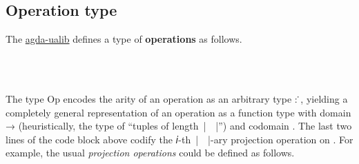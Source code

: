 \documentclass[sigplan,screen]{acmart}
\newcommand\ab[1]{\AgdaBound{#1}}
\newcommand{\agdaualib}{\href{https://ualib.org}{agda-ualib}\xspace}
\newcommand{\agdaualib}{\href{anonymizedLink/agda-ualib.html}{agda-ualib}\xspace}
\begin{document}
\subsection{Operation type}
The \agdaualib defines a type of \textbf{operations} as follows.

\begin{code}%
\>[0]\<%
\\
\>[0]\AgdaSpace{}%
\AgdaSymbol{:}\AgdaSpace{}%
\AgdaSpace{}%
\AgdaSpace{}%
\AgdaSpace{}%
\AgdaSpace{}%
\AgdaSpace{}%
\AgdaSpace{}%
\AgdaSpace{}%
\AgdaSpace{}%
\AgdaSpace{}%
\<%
\\
\>[0]\AgdaSpace{}%
\AgdaSpace{}%
\AgdaSpace{}%
\AgdaSymbol{=}\AgdaSpace{}%
\AgdaSymbol{(}\AgdaSpace{}%
\AgdaSpace{}%
\AgdaSymbol{)}\AgdaSpace{}%
\AgdaSpace{}%
\<%
\end{code}
The type Op encodes the arity of an operation as an arbitrary type \ab 𝐼 : \ab 𝓥 ̇, yielding a completely general representation of an operation as a function type with domain \ab 𝐼 → \ab 𝐴 (heuristically, the type of ``tuples of length~|~\ab 𝐼~|'') and codomain \ab 𝐴. The last two lines of the code block above codify the 𝑖-th~|~\ab 𝐼~|-ary projection operation on \ab 𝐴. For example, the usual \emph{projection operations} could be defined as follows.
\begin{code}%
\\[\AgdaEmptyExtraSkip]%
\>[0]\<%
\\
\>[0]\AgdaSpace{}%
\AgdaSymbol{:}\AgdaSpace{}%
\AgdaSymbol{\{}\AgdaSpace{}%
\AgdaSymbol{:}\AgdaSpace{}%
\AgdaSpace{}%
\AgdaSpace{}%
\AgdaSymbol{\}}\AgdaSpace{}%
\AgdaSymbol{\{}\AgdaSpace{}%
\AgdaSymbol{:}\AgdaSpace{}%
\AgdaSpace{}%
\AgdaSpace{}%
\AgdaSymbol{\}}\AgdaSpace{}%
\AgdaSpace{}%
\AgdaSpace{}%
\AgdaSpace{}%
\AgdaSpace{}%
\AgdaSpace{}%
\<%
\\
\>[0]\AgdaSpace{}%
\AgdaSpace{}%
\AgdaSpace{}%
\AgdaSymbol{=}\AgdaSpace{}%
\AgdaSpace{}%
\<%
\end{code}
\end{document}
